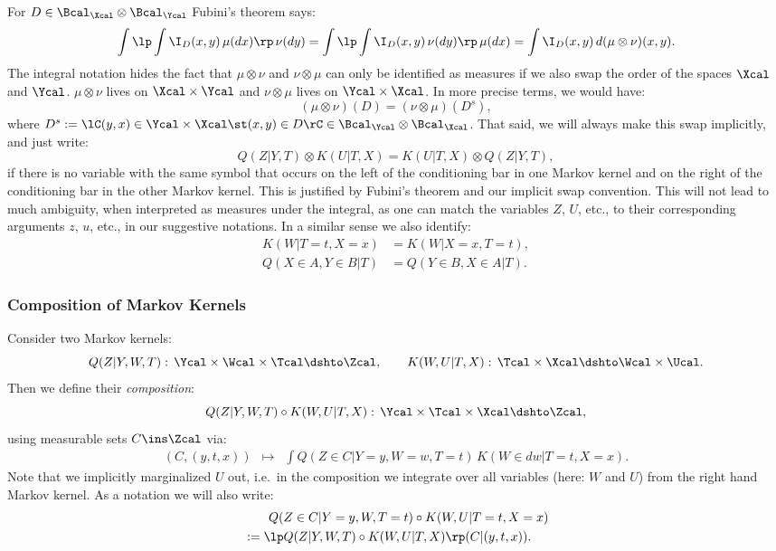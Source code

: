 \begin{Rem}\label{integration-order}
    For $D \in \Bcal_\Xcal \otimes \Bcal_\Ycal$ Fubini's theorem says:
    \[ \int\lp\int \I_D(x,y)\, \mu(dx)\rp\,\nu(dy) = \int\lp\int \I_D(x,y)\, \nu(dy)\rp\,\mu(dx) = \int \I_D(x,y) \, d(\mu\otimes\nu)(x,y). \]
    The integral notation hides the fact that $\mu \otimes \nu$ and $\nu \otimes \mu$ can only be identified as measures if we also swap the order of the spaces $\Xcal$ and $\Ycal$. $\mu \otimes \nu$ lives on $\Xcal \times \Ycal$ and $\nu \otimes \mu$ lives on $\Ycal \times \Xcal$. In more precise terms, we would have:
      \[ (\mu \otimes \nu)(D) = (\nu \otimes \mu)(D^s), \]
    where $D^s:=\lC (y,x) \in \Ycal \times \Xcal \st (x,y) \in D \rC \in \Bcal_\Ycal \otimes \Bcal_\Xcal$.
    That said, we will always make this swap implicitly, and just write:
    \[ Q(Z|Y,T) \otimes K(U|T,X) = K(U|T,X) \otimes Q(Z|Y,T), \]
    if there is no variable with the same symbol that occurs on the left of the conditioning bar in one Markov kernel and on the right of the conditioning bar in the other Markov kernel.
    This is justified by Fubini's theorem and our implicit swap convention.
    This will not lead to much ambiguity, when interpreted as measures under the integral, as one can match
    the variables $Z$, $U$, etc., to their corresponding arguments $z$, $u$, etc., in our suggestive notations.
    In a similar sense we also identify:
    \begin{align*} K(W|T=t,X=x)&=K(W|X=x,T=t),\\ Q(X \in A,Y \in B|T) &= Q(Y \in B, X \in A|T). 
    \end{align*}
\end{Rem}

\subsubsection{Composition of Markov Kernels}

\begin{Def}
        \label{def-composition-markov-kernels}
    Consider two Markov kernels:
    \[ Q(Z|Y,W,T):\, \Ycal \times \Wcal\times \Tcal \dshto \Zcal,\qquad  K(W,U|T,X):\, 
    \Tcal \times \Xcal \dshto \Wcal\times\Ucal. \]
    Then we define their \emph{composition}:
    \[ Q(Z|Y,W,T) \circ K(W,U|T,X) :\, \Ycal \times  \Tcal \times \Xcal \dshto \Zcal, \]
    using  measurable sets $C \ins \Zcal$ via:
    \[\begin{array}{ccl}
    (C,(y,t,x))    &\mapsto & \displaystyle \int Q(Z \in C|Y=y,W=w,T=t) \, K(W \in dw|T=t,X=x).
    \end{array}\]
    Note that we implicitly marginalized $U$ out, i.e.\ in the composition we integrate over all variables (here: $W$ and $U$) 
    from the right hand Markov kernel.
    As a notation we will also write:
    \begin{align*} & \qquad Q(Z \in C|Y=y,W,T=t) \circ K(W,U|T=t,X=x) \\
    &:= \lp Q(Z|Y,W,T) \circ K(W,U|T,X)\rp (C|(y,t,x)).  \end{align*}
\end{Def}


